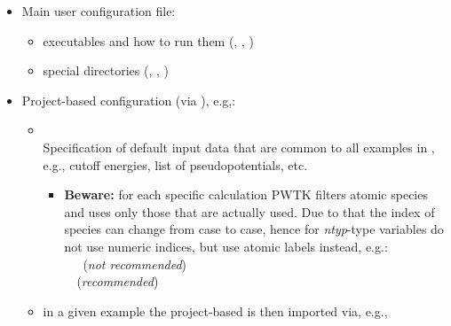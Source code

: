 \documentclass[landscape]{foils}
\begin{document}
\begin{itemize}
\item Main user configuration file: 
  \begin{itemize}
  \item executables and how to run them (, ,
    )
  \item special directories (, , )
  \end{itemize}
\item Project-based configuration (via ), e.g,:  
  \begin{itemize}
  \item {}\\[0.3em]
    Specification of default input data that are common to all examples in
    , e.g., cutoff energies, list of
    pseudopotentials, etc.
    \vspace{0.5em}
    {\small
      \begin{itemize}
      \item {\bf Beware:} for each specific calculation PWTK filters atomic
        species and uses only those that are actually used. Due to that
        the index of species can change from case to case, hence for
        {\em ntyp}-type variables do not use numeric indices, but use
        atomic labels instead, e.g.:\\
         ~~~({\red\em not recommended})\\
         ~~({\green\em recommended})
      \end{itemize}
    }
    \vspace{0.5em}
  \item in a given example the project-based  is
    then imported via, e.g.,
  \end{itemize}
\end{itemize}

\end{document}
